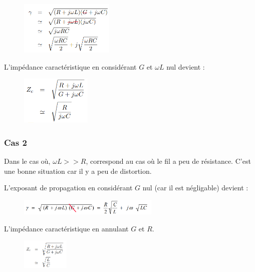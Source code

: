 			\begin{figure}[H]
				\centering
				\includegraphics[width=0.4\textwidth]{img/1.png}
			\end{figure}	
			
			L'impédance caractéristique en considérant $G$ et $\omega L$ nul devient :
			
			\begin{figure}[H]
				\centering
				\includegraphics[width=0.3\textwidth]{img/2.png}
			\end{figure}	
				
		\subsubsection{Cas 2}
			Dans le cas où, $\omega L >> R$, correspond au cas où le fil a peu de résistance.
			C'est une bonne situation car il y a peu de distortion.
			
			L'exposant de propagation en considérant $G$ nul (car il est négligable) devient :
			
			\begin{figure}[H]
				\centering
				\includegraphics[width=0.6\textwidth]{img/3.png}
			\end{figure}	
			
			L'impédance caractéristique en annulant $G$ et $R$.
			
			\begin{figure}[H]
				\centering
				\includegraphics[width=0.2\textwidth]{img/4.png}
			\end{figure}	
			
